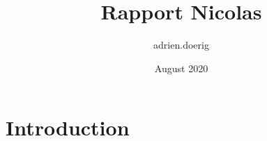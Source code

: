 \documentclass{article}
\title{Rapport Nicolas}
\author{adrien.doerig }
\date{August 2020}
\begin{document}
\maketitle

\section{Introduction}
\end{document}
